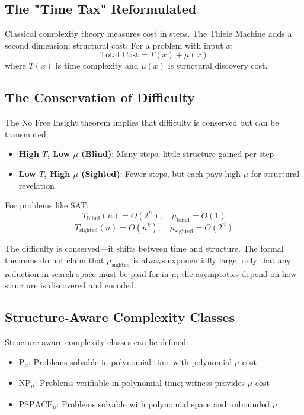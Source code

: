 \subsection{The "Time Tax" Reformulated}

Classical complexity theory measures cost in steps. The Thiele Machine adds a second dimension: structural cost. For a problem with input $x$:
\begin{equation}
    \text{Total Cost} = T(x) + \mu(x)
\end{equation}
where $T(x)$ is time complexity and $\mu(x)$ is structural discovery cost.

\subsection{The Conservation of Difficulty}

The No Free Insight theorem implies that difficulty is conserved but can be transmuted:
\begin{itemize}
    \item \textbf{High $T$, Low $\mu$ (Blind)}: Many steps, little structure gained per step
    \item \textbf{Low $T$, High $\mu$ (Sighted)}: Fewer steps, but each pays high $\mu$ for structural revelation
\end{itemize}

For problems like SAT:
\begin{equation}
    T_{\text{blind}}(n) = O(2^n), \quad \mu_{\text{blind}} = O(1)
\end{equation}
\begin{equation}
    T_{\text{sighted}}(n) = O(n^k), \quad \mu_{\text{sighted}} = O(2^n)
\end{equation}

The difficulty is conserved—it shifts between time and structure. The formal theorems do not claim that $\mu_{\text{sighted}}$ is always exponentially large, only that any reduction in search space must be paid for in $\mu$; the asymptotics depend on how structure is discovered and encoded.

\subsection{Structure-Aware Complexity Classes}

Structure-aware complexity classes can be defined:
\begin{itemize}
    \item $\text{P}_\mu$: Problems solvable in polynomial time with polynomial $\mu$-cost
    \item $\text{NP}_\mu$: Problems verifiable in polynomial time; witness provides $\mu$-cost
    \item $\text{PSPACE}_\mu$: Problems solvable with polynomial space and unbounded $\mu$
\end{itemize}

